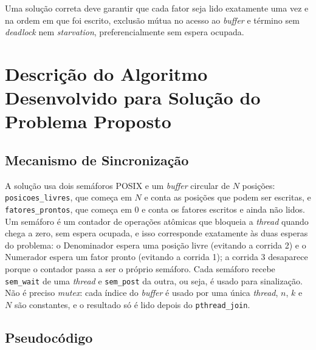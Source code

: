 \documentclass[a4paper, 12pt]{article}
\begin{document}
Uma solução correta deve garantir que cada fator seja lido exatamente uma
vez e na ordem em que foi escrito, exclusão mútua no acesso ao
\emph{buffer} e término sem \emph{deadlock} nem \emph{starvation},
preferencialmente sem espera ocupada.


\section{Descrição do Algoritmo Desenvolvido para Solução do Problema Proposto}

\subsection{Mecanismo de Sincronização}

A solução usa dois semáforos POSIX e um \emph{buffer} circular de $N$
posições: \texttt{posicoes\_livres}, que começa em $N$ e conta as posições
que podem ser escritas, e \texttt{fatores\_prontos}, que começa em 0 e conta
os fatores escritos e ainda não lidos. Um semáforo é um contador de
operações atômicas que bloqueia a \emph{thread} quando chega a zero, sem
espera ocupada, e isso corresponde exatamente às duas esperas do problema: o
Denominador espera uma posição livre (evitando a corrida 2) e o Numerador
espera um fator pronto (evitando a corrida 1); a corrida 3 desaparece porque
o contador passa a ser o próprio semáforo. Cada semáforo recebe
\texttt{sem\_wait} de uma \emph{thread} e \texttt{sem\_post} da outra, ou
seja, é usado para sinalização. Não é preciso \emph{mutex}: cada índice do
\emph{buffer} é usado por uma única \emph{thread}, $n$, $k$ e $N$ são
constantes, e o resultado só é lido depois do \texttt{pthread\_join}.


\subsection{Pseudocódigo}
\end{document}

